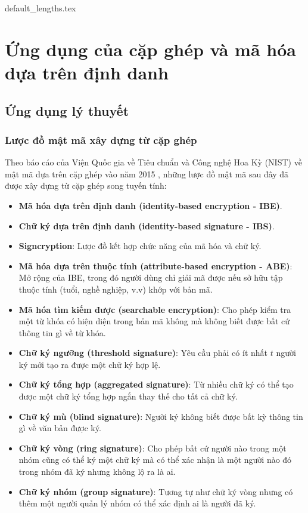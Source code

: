\documentclass[class=report, crop=false]{standalone}
\begin{document}
	{default_lengths.tex}
	\chapter{Ứng dụng của cặp ghép và mã hóa dựa trên định danh}\label{chap:6}
	\section{Ứng dụng lý thuyết}
		\subsection{Lược đồ mật mã xây dựng từ cặp ghép}
			Theo báo cáo của Viện Quốc gia về Tiêu chuẩn và Công nghệ Hoa Kỳ (NIST) về mật mã dựa trên cặp ghép vào năm 2015 \cite{nist_report}, những lược đồ mật mã sau đây đã được xây dựng từ cặp ghép song tuyến tính:
			\vspace{-0.5\baselineskip}
			\begin{itemize}
				\item \textbf{Mã hóa dựa trên định danh (identity-based encryption - IBE)}.
				\item \textbf{Chữ ký dựa trên định danh (identity-based signature - IBS)}.
				\item \textbf{Signcryption}: Lược đồ kết hợp chức năng của mã hóa và chữ ký.
				\item \textbf{Mã hóa dựa trên thuộc tính (attribute-based encryption - ABE)}: Mở rộng của IBE, trong đó người dùng chỉ giải mã được nếu sở hữu tập thuộc tính (tuổi, nghề nghiệp, v.v) khớp với bản mã.
				\item \textbf{Mã hóa tìm kiếm được (searchable encryption)}: Cho phép kiểm tra một từ khóa có hiện diện trong bản mã không mà không biết được bất cứ thông tin gì về từ khóa.
				\item \textbf{Chữ ký ngưỡng (threshold signature)}: Yêu cầu phải có ít nhất $t$ người ký mới tạo ra được một chữ ký hợp lệ.
				\item \textbf{Chữ ký tổng hợp (aggregated signature)}: Từ nhiều chữ ký có thể tạo được một chữ ký tổng hợp ngắn thay thế cho tất cả chữ ký.
				\item \textbf{Chữ ký mù (blind signature)}: Người ký không biết được bất kỳ thông tin gì về văn bản được ký.
				\item \textbf{Chữ ký vòng (ring signature)}: Cho phép bất cứ người nào trong một nhóm cũng có thể ký một chữ ký mà có thể xác nhận là một người nào đó trong nhóm đã ký nhưng không lộ ra là ai.
				\item \textbf{Chữ ký nhóm (group signature)}: Tương tự như chữ ký vòng nhưng có thêm một người quản lý nhóm có thể xác định ai là người đã ký.
			\end{itemize}
\end{document}
